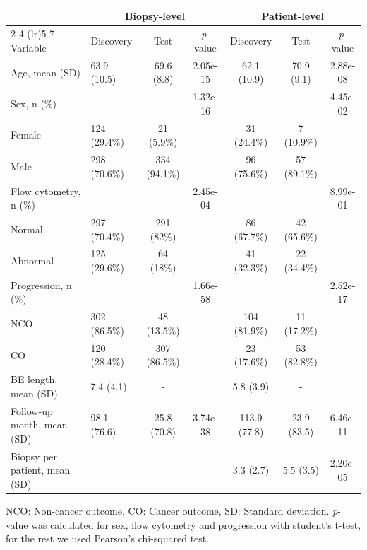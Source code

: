 \documentclass{article}
\begin{document}
\begin{table}[htbp]
\centering
\begin{tabular}{@{}llccccc@{}}
\toprule
& \multicolumn{3}{c}{Biopsy-level} & \multicolumn{3}{c}{Patient-level} \\
\cmidrule(lr){2-4} \cmidrule(lr){5-7}
Variable & Discovery & Test & \textit{p}-value & Discovery & Test & \textit{p}-value \\
\midrule
Age, mean (SD) & 63.9 (10.5) & 69.6 (8.8) & 2.05e-15 & 62.1 (10.9) & 70.9 (9.1) & 2.88e-08 \\
\addlinespace
Sex, n (\%) & & & 1.32e-16 & & &4.45e-02 \\
\qquad Female & 124 (29.4\%)   & 21 (5.9\%) & &31 (24.4\%) &7 (10.9\%)  & \\
\qquad Male & 298 (70.6\%) &334 (94.1\%) &  & 96 (75.6\%) & 57 (89.1\%) & \\
\addlinespace
Flow cytometry, n (\%) & & &2.45e-04& & &8.99e-01 \\
\qquad Normal & 297 (70.4\%)&291 (82\%) & & 86 (67.7\%) & 42 (65.6\%) & \\
\qquad Abnormal & 125 (29.6\%) &64 (18\%) &  & 41 (32.3\%) & 22 (34.4\%) & \\
\addlinespace
Progression, n (\%) & & & 1.66e-58 & & &2.52e-17\\
\qquad NCO & 302 (86.5\%) & 48 (13.5\%) & & 104 (81.9\%) & 11 (17.2\%) & \\
\qquad CO & 120 (28.4\%) & 307 (86.5\%) & &  23 (17.6\%) & 53 (82.8\%) & \\
\addlinespace
BE length, mean (SD) & 7.4 (4.1) & -& &     5.8 (3.9) & -  & \\
\addlinespace
Follow-up month, mean (SD) & 98.1 (76.6) & 25.8 (70.8) & 3.74e-38 & 113.9 (77.8) & 23.9 (83.5) & 6.46e-11\\
\addlinespace
Biopsy per patient, mean (SD) & & & & 3.3 (2.7) & 5.5 (3.5)  &2.20e-05 \\
\bottomrule
\end{tabular}

\vspace{0.3cm}
\footnotesize
\begin{minipage}{16cm}
NCO: Non-cancer outcome, CO: Cancer outcome, SD: Standard deviation. \textit{p}-value was calculated for sex, flow cytometry and progression with student's t-test, for the rest we used Pearson's chi-squared test.
\end{minipage}
\end{table}
\end{document}
